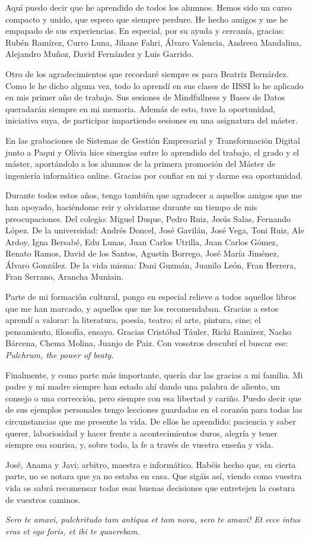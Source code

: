 Aquí puedo decir que he aprendido de todos los alumnos. Hemos sido un curso compacto y unido, que espero que siempre perdure. He hecho amigos y me he empapado de sus experiencias. En especial, por su ayuda y cercanía, gracias: Rubén Ramírez, Curro Luna, Jihane Fahri, Álvaro Valencia, Andreea Mandalina, Alejandro Muñoz, David Fernández y Luis Garrido.

Otro de los agradecimientos que recordaré siempre es para Beatriz Bernárdez. Como le he dicho alguna vez, todo lo aprendí en sus clases de IISSI lo he aplicado en mis primer año de trabajo. Sus sesiones de Mindfullness y Bases de Datos queradarán siempre en mi memoria. Además de esto, tuve la oportunidad, iniciativa suya, de participar impartiendo sesiones en una asignatura del máster.

En las grabaciones de Sistemas de Gestión Empresarial y Transformación Digital junto a Paqui y Olivia hice sinergias entre lo aprendido del trabajo, el grado y el máster, aportándolo a los alumnos de la primera promoción del Máster de ingeniería informática online. Gracias por confiar en mi y darme esa oportunidad.

Durante todos estos años, tengo también que agradecer a aquellos amigos que me han apoyado, haciéndome reir y olvidarme durante un tiempo de mis preocupaciones. Del colegio: Miguel Duque, Pedro Ruiz, Jesús Salas, Fernando López. De la universidad: Andrés Doncel, José Gavilán, José Vega, Toni Ruiz, Ale Ardoy, Igna Bersabé, Edu Lunas, Juan Carlos Utrilla, Juan Carlos Gómez, Renato Ramos, David de los Santos, Agustín Borrego, José María Jiménez, Álvaro González. De la vida misma: Dani Guzmán, Juanilo León, Fran Herrera, Fran Serrano, Arancha Muniain.

Parte de mi formación cultural, pongo en especial relieve a todos aquellos libros que me han marcado, y aquellos que me los recomendaban. Gracias a estos aprendí a valorar: la literatura, poesía, teatro; el arte, pintura, cine; el pensamiento, filosofía, ensayo. Gracias Cristóbal Táuler, Richi Ramírez, Nacho Bárcena, Chema Molina, Juanjo de Paiz. Con vosotros descubrí el buscar ese: \textit{Pulchrum, the power of beaty}.

Finalmente, y como parte más importante, quería dar las gracias a mi familia. Mi padre y mi madre siempre han estado ahí dando una palabra de aliento, un consejo o una corrección, pero siempre con esa libertad y cariño. Puedo decir que de sus ejemplos personales tengo lecciones guardadas en el corazón para todas las circunstancias que me presente la vida. De ellos he aprendido: paciencia y saber querer, laboriosidad y hacer frente a acontecimientos duros, alegría y tener siempre esa sonrisa, y, sobre todo, la fe a través de vuestra enseña y vida.

José, Anama y Javi; arbitro, maestra e informático. Habéis hecho que, en cierta parte, no se notara que ya no estaba en casa. Que sigáis así, viendo como vuestra vida os sabrá recomensar todas esas buenas decisiones que entretejen la costura de vuestros caminos.

\newline
\hfill \textit{Sero te amavi, pulchritudo tam antiqua et tam nova, sero te amavi! Et ecce intus eras et ego foris, et ibi te quaerebam}.
\newline